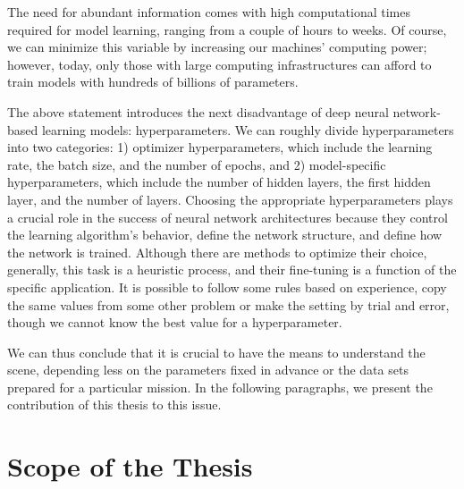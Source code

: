 The need for abundant information comes with high computational times required for model learning, ranging from a couple of hours to weeks. Of course, we can minimize this variable by increasing our machines' computing power; however, today, only those with large computing infrastructures can afford to train models with hundreds of billions of parameters.  

The above statement introduces the next disadvantage of deep neural network-based learning models: hyperparameters. We can roughly divide hyperparameters into two categories: 1) optimizer hyperparameters, which include the learning rate, the batch size, and the number of epochs, and 2) model-specific hyperparameters, which include the number of hidden layers, the first hidden layer, and the number of layers. Choosing the appropriate hyperparameters plays a crucial role in the success of neural network architectures because they control the learning algorithm's behavior, define the network structure, and define how the network is trained. Although there are methods to optimize their choice, generally, this task is a heuristic process, and their fine-tuning is a function of the specific application. It is possible to follow some rules based on experience, copy the same values from some other problem or make the setting by trial and error, though we cannot know the best value for a hyperparameter.

We can thus conclude that it is crucial to have the means to understand the scene, depending less on the parameters fixed in advance or the data sets prepared for a particular mission. In the following paragraphs, we present the contribution of this thesis to this issue.



\section*{Scope of the Thesis}

